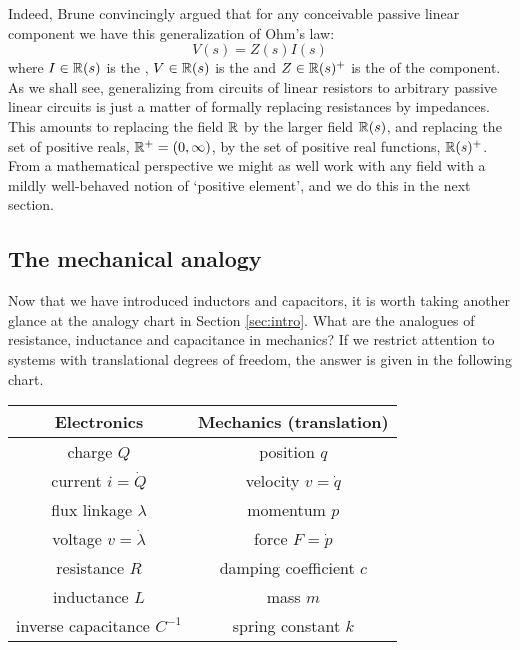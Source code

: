 Indeed, Brune convincingly argued that for any conceivable passive linear component we have this generalization of Ohm's law:
\[
  V(s)=Z(s)I(s)
\]
where $I \in {\mathbb{R}}(s)$ is the , $V \in {\mathbb{R}}(s)$ is the 
and $Z \in {\mathbb{R}}(s)^+$ is the  of the component.   As we shall see, generalizing from circuits of linear resistors to arbitrary passive linear circuits is just a matter of formally replacing resistances by  impedances.  This amounts to replacing the field ${\mathbb{R}}$ by the larger field ${\mathbb{R}}(s)$, and replacing the set of positive reals, ${\mathbb{R}}^+ = (0,\infty)$, by the set of positive real functions, ${\mathbb{R}}(s)^+$.  From a mathematical perspective we might as well work with any field with a mildly well-behaved notion of `positive element', and we do this in the next section.

\subsection{The mechanical analogy} \label{sec:mechanical}

Now that we have introduced inductors and capacitors, it is worth taking 
another glance at the analogy chart in Section \ref{sec:intro}.  What are the
analogues of resistance, inductance and capacitance in mechanics?  If we restrict attention to systems with translational degrees of freedom, the answer is given in the following
chart.

\begin{small}
\begin{center}
\begin{tabular}{|c|c|}
\hline
Electronics & Mechanics (translation) \\
\hline\hline
charge $Q$ & position $q$ \\
\hline
current $i = \dot Q$ & velocity $v = \dot q$ \\
\hline
flux linkage $\lambda$ & momentum $p$ \\
\hline
voltage $v = \dot \lambda$ & force $F = \dot p$ \\
\hline
resistance $R$ & damping coefficient $c$ \\
\hline
inductance $L$ & mass $m$ \\
\hline
inverse capacitance $C^{-1}$ & spring constant $k$ \\
\hline
\end{tabular}
\end{center}
\end{small}

